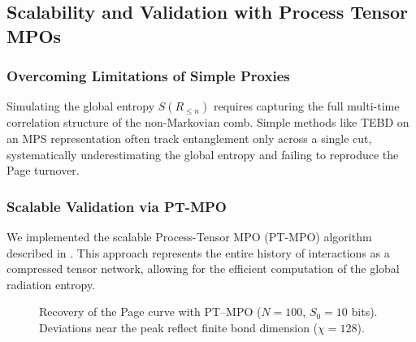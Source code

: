 \documentclass[aps,prd,preprint,onecolumn,superscriptaddress,nofootinbib,longbibliography,floatfix,11pt,showpacs,showkeys]{revtex4-2}
\newcounter{algorithm}
\theoremstyle{plain}
\theoremstyle{definition}
\theoremstyle{remark}
\begin{document}
\begin{table}[htbp]
\centering
\caption{Repetition-code fidelity vs.\ temporal noise correlation $\rho$ and error rate $p$.}
\label{tab:qec}
\vspace{0.5em}
\footnotesize
{}
\pgfplotstabletypeset{\datatableQEC}
\end{table}

\subsection{Scalability and Validation with Process Tensor MPOs}
\label{sec:mpo_mps_validation}
\subsubsection{Overcoming Limitations of Simple Proxies}
Simulating the global entropy $S(R_{\le n})$ requires capturing the full multi-time correlation structure of the non-Markovian comb. Simple methods like TEBD on an MPS representation often track entanglement only across a single cut, systematically underestimating the global entropy and failing to reproduce the Page turnover.

\subsubsection{Scalable Validation via PT-MPO}
We implemented the scalable Process-Tensor MPO (PT-MPO) algorithm described in . This approach represents the entire history of interactions as a compressed tensor network, allowing for the efficient computation of the global radiation entropy.

\begin{figure}[htbp]
\centering
{}
\caption{Recovery of the Page curve with PT--MPO ($N=100$, $S_0=10$ bits).
Deviations near the peak reflect finite bond dimension ($\chi=128$).}
\label{fig:ptmpo_page}
\end{figure}
\end{document}

